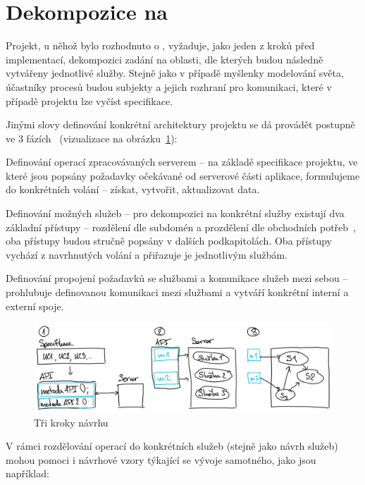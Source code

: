 \section{Dekompozice na }\label{sec:msa-decomposition}

Projekt, u něhož bylo rozhodnuto o , vyžaduje, jako jeden z kroků před implementací, dekompozici zadání na oblasti, dle kterých budou následně vytvářeny jednotlivé služby.
Stejně jako v případě myšlenky modelování světa, účastníky procesů budou subjekty a jejich rozhraní pro komunikaci, které v případě projektu lze vyčíst specifikace.

Jinými slovy definování konkrétní architektury projektu se dá provádět postupně ve 3 fázích~\cite{msachris} (vizualizace na obrázku~\ref{fig:msa-decomposition-flow}):


\begin{ol}
   \item Definování operací zpracovávaných serverem – na základě specifikace projektu, ve které jsou popsány požadavky očekávané od serverové části aplikace, formulujeme do konkrétních volání – získat, vytvořit, aktualizovat data.
   \item Definování možných služeb – pro dekompozici na konkrétní služby existují dva základní přístupy – rozdělení dle subdomén a prozdělení dle obchodních potřeb~\cite{msachris}, oba přístupy budou stručně popsány v dalších podkapitolách.
   Oba přístupy vychází z navrhnutých volání a přiřazuje je jednotlivým službám.
   \item Definování propojení požadavků se službami a komunikace služeb mezi sebou – prohlubuje definovanou komunikaci mezi službami a vytváří konkrétní interní a externí spoje.
\end{ol}


\begin{figure}[htbp]
   \centering
   \includegraphics[max width=\textwidth]{assets/draft-decomposition-flow}
   \caption{Tři kroky návrhu }\label{fig:msa-decomposition-flow}
\end{figure}


V rámci rozdělování operací do konkrétních služeb (stejně jako návrh služeb) mohou pomoci i návrhové vzory týkající se vývoje samotného, jako jsou například:


